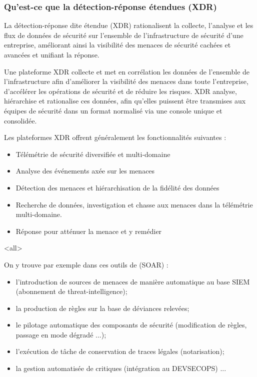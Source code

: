 \subsubsection{Qu'est-ce que la détection-réponse étendues (XDR)}


La détection-réponse dite étendue (XDR) rationalisent la collecte, l'analyse et les flux de données de sécurité sur l'ensemble de l'infrastructure de sécurité d'une entreprise, améliorant ainsi la visibilité des menaces de sécurité cachées et avancées et unifiant la réponse.

Une plateforme XDR collecte et met en corrélation les données de l'ensemble de l'infrastructure afin d'améliorer la visibilité des menaces dans toute l'entreprise, d'accélérer les opérations de sécurité et de réduire les risques. XDR analyse, hiérarchise et rationalise ces données, afin qu'elles puissent être transmises aux équipes de sécurité dans un format normalisé via une console unique et consolidée.

Les plateformes XDR offrent généralement les fonctionnalités suivantes :

\begin{itemize}
  \item Télémétrie de sécurité diversifiée et multi-domaine
  \item Analyse des événements axée sur les menaces
  \item Détection des menaces et hiérarchisation de la fidélité des données
  \item Recherche de données, investigation et chasse aux menaces dans la télémétrie multi-domaine.
  \item Réponse pour atténuer la menace et y remédier
\end{itemize}


\mode<all>{
{
On y trouve par exemple dans ces outils de   (SOAR) :
\begin{itemize}
  \item l'introduction de sources de menaces de manière automatique au base SIEM (abonnement de threat-intelligence);
  \item la production de règles sur la base de déviances relevées;
  \item le pilotage automatique des composants de sécurité (modification de règles, passage en mode dégradé ...);
  \item l'exécution de tâche de conservation de traces légales (notarisation);
  \item la gestion automatisée de  critiques (intégration au DEVSECOPS) ...
\end{itemize}
}} %

